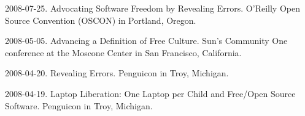 \documentclass[10pt]{article}
\newenvironment{cvlist}{
\begin{list}{}{\leftmargin=3.0em \itemindent=-3.0em}
  \setlength{\itemsep}{0pt}
  \setlength{\parskip}{0em}
  \setlength{\parsep}{1em}
  \setlength{\parindent}{0em}}
{\vspace{1em}
\end{list}}
\begin{document}
\begin{cvlist}
\item 2008-07-25. Advocating Software Freedom by Revealing Errors. O'Reilly Open Source Convention (OSCON) in Portland, Oregon. %
\item 2008-05-05. Advancing a Definition of Free Culture. Sun's Community One conference at the Moscone Center in San Francisco, California.
\item 2008-04-20. Revealing Errors. Penguicon in Troy, Michigan. %
\item 2008-04-19. Laptop Liberation: One Laptop per Child and Free/Open Source Software. Penguicon in Troy, Michigan. %

\end{cvlist}
\end{document}
